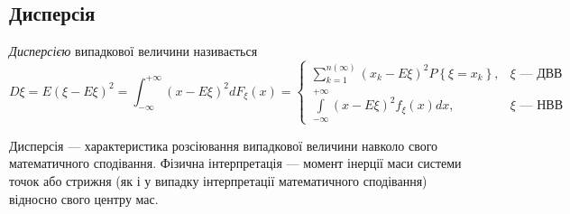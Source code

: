 \subsection{Дисперсія}
\begin{definition}
    \emph{Дисперсією} випадкової величини називається 
    \begin{equation}\label{eq:d_xi}
        D\xi = E\left(\xi-E\xi\right)^2 = \int_{-\infty}^{+\infty} \left(x-E\xi\right)^2 dF_\xi(x) = \begin{cases}
            \sum\limits_{k=1}^{n(\infty)} \left(x_k-E\xi\right)^2 P\left\{\xi = x_k\right\}, & \xi \text{ --- ДВВ} \\
            \int\limits_{-\infty}^{+\infty} \left(x-E\xi\right)^2 f_\xi(x)dx, & \xi \text{ --- НВВ}
        \end{cases}
    \end{equation}
\end{definition}
Дисперсія --- характеристика розсіювання випадкової величини навколо свого математичного сподівання.
Фізична інтерпретація --- момент інерції маси системи точок або стрижня (як і у випадку інтерпретації математичного сподівання)
відносно свого центру мас.

